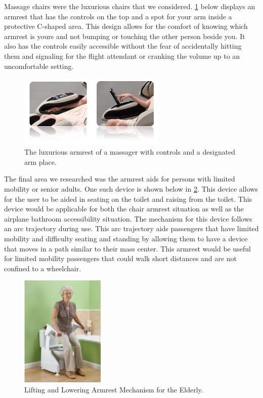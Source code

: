 Massage chairs were the luxurious chairs that we considered.  \ref{fig:MassagerArmrests.jpg}  below displays an armrest that has the controls on the top and a spot for your arm inside a protective C-shaped area. This design allows for the comfort of knowing which armrest is yours and not bumping or touching the other person beside you.  It also has the controls easily accessible without the fear of accidentally hitting them and signaling for the flight attendant or cranking the volume up to an uncomfortable setting.

\begin{figure}[h]
  \centering
     \includegraphics[width=7cm]{images/MassagerArmrest.jpg}
   \caption{ The luxurious armrest of a massager with controls and a designated arm place. \cite{massage}}
  \label{fig:MassagerArmrests.jpg}
\end{figure}
 
 
The final area we researched was the armrest aids for persons with limited mobility or senior adults.  One such device is shown below in \ref{fig:AssistiveArmrests.jpg}.  This device allows for the user to be aided in seating on the toilet and raising from the toilet.  This device would be applicable for both the chair armrest situation as well as the airplane bathroom accessibility situation. The mechanism for this device follows an arc trajectory during use. This arc trajectory aids passengers that have limited mobility and difficulty seating and standing by allowing them to have a device that moves in a path similar to their mass center. This armrest would be useful for limited mobility passengers that could walk short distances and are not confined to a wheelchair.

\begin{figure}[h]
  \centering
     \includegraphics[width=4cm]{images/AssistiveArmrest.jpg}
   \caption{ Lifting and Lowering Armrest Mechanism for the Elderly. \cite{toilet}}
  \label{fig:AssistiveArmrests.jpg}
\end{figure}


